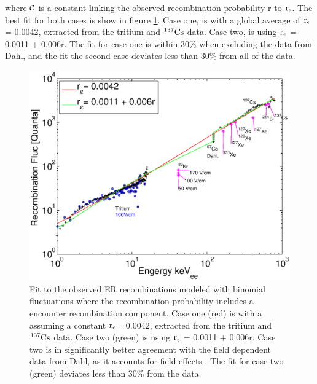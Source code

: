 \noindent where $\rm \mathcal{C}$ is a constant linking the observed recombination probability r to $\rm r_\epsilon$. The best fit for both cases is show in figure \ref{fig:Flucs_Model}. Case one, is with a global average of $\rm r_\epsilon$= 0.0042, extracted from the tritium and $\rm^{137}Cs$ data. Case two, is using $\rm r_\epsilon$ = 0.0011 + 0.006r. The fit for case one is within 30\% when excluding the data from Dahl, and the fit the second case deviates less than 30\% from all of the data.

\renewcommand{\baselinestretch}{1}
\small\normalsize
\begin{figure}[h!]\centering
\includegraphics[width=120mm]{Chapter_Flucs/Figures/Recomb_Flucs/R_v_E_model_iter1.eps}
\caption{ Fit to the observed ER recombinations modeled with binomial fluctuations where the recombination probability includes a encounter recombination component. Case one (red) is with a assuming a constant $\rm r_\epsilon$= 0.0042, extracted from the tritium and $\rm^{137}Cs$ data. Case two (green) is using $\rm r_\epsilon$ = 0.0011 + 0.006r. Case two is in significantly better agreement with the field dependent data from Dahl, as it accounts for field effects \cite{Dahl_Thesis}. The fit for case two (green) deviates less than 30\% from the data.}
\label{fig:Flucs_Model}
\end{figure}
\renewcommand{\baselinestretch}{2}
\small\normalsize

